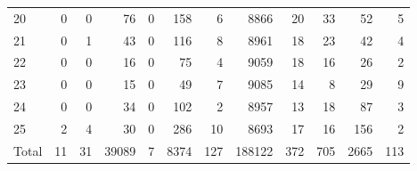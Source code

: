 \begin{table}
\begin{tabular}{lrrrrrrrrrrr}
20 & 0 & 0 & 76 & 0 & 158 & 6 & 8866 & 20 & 33 & 52 & 5 \\
21 & 0 & 1 & 43 & 0 & 116 & 8 & 8961 & 18 & 23 & 42 & 4 \\
22 & 0 & 0 & 16 & 0 & 75 & 4 & 9059 & 18 & 16 & 26 & 2 \\
23 & 0 & 0 & 15 & 0 & 49 & 7 & 9085 & 14 & 8 & 29 & 9 \\
24 & 0 & 0 & 34 & 0 & 102 & 2 & 8957 & 13 & 18 & 87 & 3 \\
25 & 2 & 4 & 30 & 0 & 286 & 10 & 8693 & 17 & 16 & 156 & 2 \\
Total & 11 & 31 & 39089 & 7 & 8374 & 127 & 188122 & 372 & 705 & 2665 & 113 \\
\end{tabular}
\end{table}
